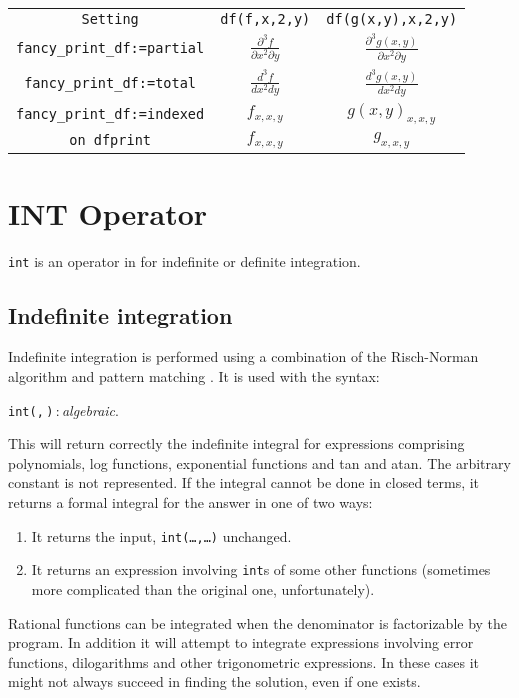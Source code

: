 \begin{tabular}{ccc}
  \texttt{Setting} & \texttt{df(f,x,2,y)} & \texttt{df(g(x,y),x,2,y)} \\
  \texttt{fancy\_print\_df:=partial} &
  \(\frac{\partial^3 f}{\partial x^2 \partial y}\) &
  \(\frac{\partial^3 g(x,y)}{\partial x^2 \partial y}\) \\
  \texttt{fancy\_print\_df:=total} & \(\frac{d^3 f}{d x^2 d y}\) &
  \(\frac{d^3 g(x,y)}{d x^2 d y}\) \\
  \texttt{fancy\_print\_df:=indexed} & \(f_{x,x,y}\) & \(g(x,y)_{x,x,y}\) \\
  \texttt{on dfprint} & \(f_{x,x,y}\) & \(g_{x,x,y}\)
\end{tabular}

\section{INT Operator}
\hypertarget{operator:INT}{}
\texttt{int} is an operator in {\REDUCE} for indefinite or definite integration.

\subsection{Indefinite integration}
Indefinite
integration is performed using a
combination of the Risch-Norman algorithm and pattern matching \cite{Norman:77,Harrington:79,Norman:79}.
It is used with the syntax:
\begin{syntax}
  \texttt{int(}\texttt{,}\,\texttt{)}\,:\,\textit{algebraic}.
\end{syntax}
This will return correctly the indefinite integral for expressions comprising
polynomials, log functions, exponential functions and tan and atan. The
arbitrary constant is not represented. If the integral cannot be done in
closed terms, it returns a formal integral for the answer in one of two ways:
\begin{enumerate}
\item It returns the input, \texttt{int(\ldots,\ldots)} unchanged.

\item It returns an expression involving \texttt{int}s of some
      other functions (sometimes more complicated than
      the original one, unfortunately).
\end{enumerate}
Rational functions can be integrated when the denominator is factorizable
by the program. In addition it will attempt to integrate expressions
involving error functions, dilogarithms and other trigonometric
expressions. In these cases it might not always succeed in finding the
solution, even if one exists.

